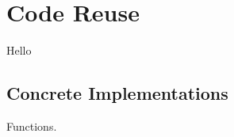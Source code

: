 \chapter{Code Reuse}

Hello

\section{Concrete Implementations}

\csharpsubsection{\csharp}

\begin{syntaxfloat}
  
  \caption{Functions.}
  \label{syntax:fun}
\end{syntaxfloat}






